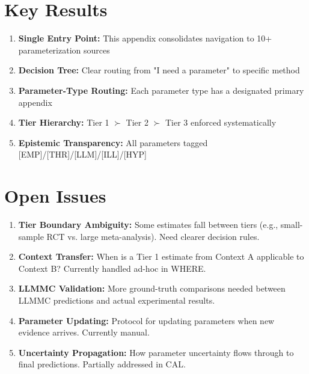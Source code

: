 
\section{Key Results}
\label{sec:pm-results}

\begin{tcolorbox}[colback=green!5!white, colframe=green!75!black, title=Key Results]
\begin{enumerate}
    \item \textbf{Single Entry Point:} This appendix consolidates navigation to 10+ parameterization sources
    \item \textbf{Decision Tree:} Clear routing from "I need a parameter" to specific method
    \item \textbf{Parameter-Type Routing:} Each parameter type has a designated primary appendix
    \item \textbf{Tier Hierarchy:} Tier 1 $\succ$ Tier 2 $\succ$ Tier 3 enforced systematically
    \item \textbf{Epistemic Transparency:} All parameters tagged [EMP]/[THR]/[LLM]/[ILL]/[HYP]
\end{enumerate}
\end{tcolorbox}


\section{Open Issues}
\label{sec:pm-open-issues}

\begin{enumerate}
    \item \textbf{Tier Boundary Ambiguity:} Some estimates fall between tiers (e.g., small-sample RCT vs. large meta-analysis). Need clearer decision rules.

    \item \textbf{Context Transfer:} When is a Tier 1 estimate from Context A applicable to Context B? Currently handled ad-hoc in WHERE.

    \item \textbf{LLMMC Validation:} More ground-truth comparisons needed between LLMMC predictions and actual experimental results.

    \item \textbf{Parameter Updating:} Protocol for updating parameters when new evidence arrives. Currently manual.

    \item \textbf{Uncertainty Propagation:} How parameter uncertainty flows through to final predictions. Partially addressed in CAL.
\end{enumerate}

